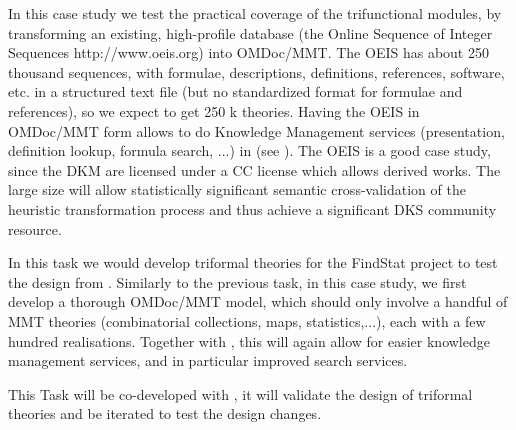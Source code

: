 \begin{workpackage}[id=dksbases,wphases=1-48!.5,
  title=Data/Knowledge/Software-Bases,lead=JU,
  ZHRM=12,JURM=36,USHRM=12,UWRM=25,SARM=10,LLRM=2,PSRM=4]
\begin{tasklist}
\begin{task}[title=OEIS Case Study (Coverage and automated import),id=data-OEIS,lead=JU]
  In this case study we test the practical coverage of the trifunctional modules, by
  transforming an existing, high-profile database (the Online Sequence of Integer
  Sequences http://www.oeis.org) into OMDoc/MMT. The OEIS has about 250 thousand
  sequences, with formulae, descriptions, definitions, references, software, etc. in a
  structured text file (but no standardized format for formulae and references), so we
  expect to get 250 k theories. Having the OEIS in OMDoc/MMT form allows to do Knowledge
  Management services (presentation, definition lookup, formula search, ...) in
  \MathHub (see ). The OEIS is a good case study, since the DKM are licensed
  under a CC license which allows derived works. The large size will allow statistically
  significant semantic cross-validation of the heuristic transformation process and thus
  achieve a significant DKS community resource.
\end{task}


\begin{task}[title=FindStat Case Study (triformal theories),id=data-findstat,
  lead=JU,partners={ZH}]
  In this task we would develop triformal theories for the FindStat project to test the
  design from .  Similarly to the previous task, in this
  case study, we first develop a thorough OMDoc/MMT model, which should only involve a
  handful of MMT theories (combinatorial collections, maps, statistics,...), each with a
  few hundred realisations. Together with , this will again allow for
  easier knowledge management services, and in particular improved search services.

  This Task will be co-developed with , it will validate
  the design of triformal theories and be iterated to test the design changes.
\end{task}


\end{tasklist}
\end{workpackage}
